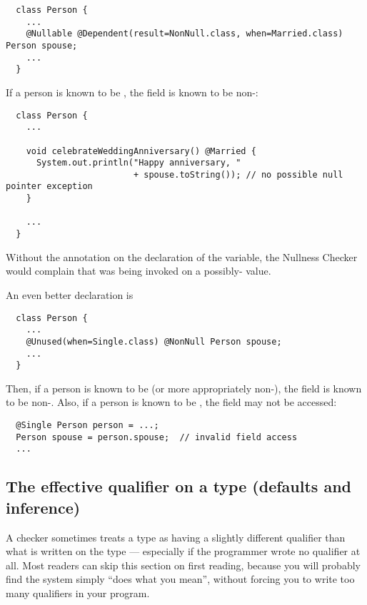 \begin{Verbatim}
  class Person {
    ...
    @Nullable @Dependent(result=NonNull.class, when=Married.class) Person spouse;
    ...
  }
\end{Verbatim}

If a person is known to be , the
 field is known to be non-:

\begin{Verbatim}
  class Person {
    ...

    void celebrateWeddingAnniversary() @Married {
      System.out.println("Happy anniversary, "
                         + spouse.toString()); // no possible null pointer exception
    }

    ...
  }
\end{Verbatim}

Without the  annotation on the
declaration of the  variable, the Nullness Checker would
complain that  was being invoked on a possibly-
value.

An even better declaration is

\begin{Verbatim}
  class Person {
    ...
    @Unused(when=Single.class) @NonNull Person spouse;
    ...
  }
\end{Verbatim}

Then, if a person is known to be  (or more
appropriately non-), the  field is known to
be non-.  Also, if a person is known to be ,
the  field may not be accessed:
 
\begin{Verbatim}
  @Single Person person = ...;
  Person spouse = person.spouse;  // invalid field access
  ...
\end{Verbatim}


\subsection{The effective qualifier on a type (defaults and inference)\label{effective-qualifier}}

A checker sometimes treats a type as having a slightly different qualifier
than what is written on the type --- especially if the programmer wrote no
qualifier at all.
Most readers can skip this section on first reading, because you will
probably find the system simply ``does what you mean'', without forcing
you to write too many qualifiers in your program.

